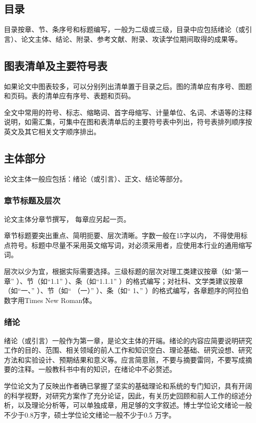 \subsection{目录}
目录按章、节、条序号和标题编写，一般为二级或三级，目录中应包括绪论（或引言）、论文主体、结论、附录、参考文献、附录、攻读学位期间取得的成果等。

\subsection{图表清单及主要符号表}
如果论文中图表较多，可以分别列出清单置于目录之后。图的清单应有序号、图题和页码。表的清单应有序号、表题和页码。

全文中常用的符号、标志、缩略词、首字母缩写、计量单位、名词、术语等的注释说明，如需汇集，可集中在图和表清单后的主要符号表中列出，符号表排列顺序按英文及其它相关文字顺序排出。

\subsection{主体部分}
论文主体一般应包括：绪论（或引言）、正文、结论等部分。

\subsubsection{章节标题及层次}
论文主体分章节撰写， 每章应另起一页。

章节标题要突出重点、简明扼要、层次清晰。字数一般在15字以内， 不得使用标点符号。标题中尽量不采用英文缩写词，对必须采用者，应使用本行业的通用缩写词。

层次以少为宜，根据实际需要选择。三级标题的层次对理工类建议按章（如“第一章” ）、节（如“1.1” ）、条（如“1.1.1” ）的格式编写；对社科、文学类建议按章（如“一、” ）、节（如“ （一）” ）、条（如“ 1、” ）的格式编写，各章题序的阿拉伯数字用Times New Roman体。

\subsubsection{绪论}
绪论（或引言）一般作为第一章，是论文主体的开端。绪论的内容应简要说明研究工作的目的、范围、相关领域的前人工作和知识空白、理论基础、研究设想、研究方法和实验设计、预期结果和意义等。应言简意赅，不要与摘要雷同，不要写成摘要的注释。一般教科书中有的知识，在绪论中不必赘述。

学位论文为了反映出作者确已掌握了坚实的基础理论和系统的专门知识，具有开阔的科学视野，对研究方案作了充分论证，因此，有关历史回顾和前人工作的综述分析，以及理论分析等，可以单独成章，用足够的文字叙述。博士学位论文绪论一般不少于0.8万字，硕士学位论文绪论一般不少于0.5 万字。


